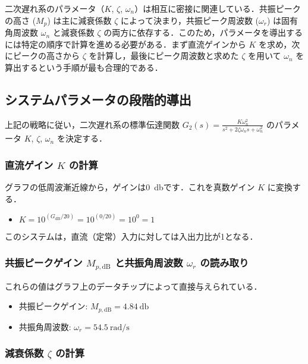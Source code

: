 \documentclass[11pt,a4paper]{ltjsarticle}
\newcommand{\supcite}[1]{\textsuperscript{\cite{#1}}}
\begin{document}
二次遅れ系のパラメータ（$K$, $\zeta$, $\omega_n$）は相互に密接に関連している．共振ピークの高さ ($M_p$) は主に減衰係数 $\zeta$ によって決まり，共振ピーク周波数 ($\omega_r$) は固有角周波数 $\omega_n$ と減衰係数 $\zeta$ の両方に依存する．このため，パラメータを導出するには特定の順序で計算を進める必要がある．まず直流ゲインから $K$ を求め，次にピークの高さから $\zeta$ を計算し，最後にピーク周波数と求めた $\zeta$ を用いて $\omega_n$ を算出するという手順が最も合理的である．

\subsection{システムパラメータの段階的導出}

上記の戦略に従い，二次遅れ系の標準伝達関数 $G_2(s) = \frac{K\omega_n^2}{s^2 + 2\zeta\omega_n s + \omega_n^2}$ のパラメータ $K$, $\zeta$, $\omega_n$ を決定する\supcite{ref8}．

\subsubsection{直流ゲイン $K$ の計算}

グラフの低周波漸近線から，ゲインは\SI{0}{\decibel}です\supcite{ref1}．これを真数ゲイン $K$ に変換する．
\begin{itemize}
    \item $K = 10^{(G_{\text{dB}}/20)} = 10^{(0/20)} = 10^0 = 1$
\end{itemize}
このシステムは，直流（定常）入力に対しては入出力比が1となる．

\subsubsection{共振ピークゲイン \texorpdfstring{$M_{p,\text{dB}}$}{Mp,dB} と共振角周波数 \texorpdfstring{$\omega_r$}{ωr} の読み取り}

これらの値はグラフ上のデータチップによって直接与えられている\supcite{ref1}．
\begin{itemize}
    \item 共振ピークゲイン: $M_{p,\text{dB}} = \SI{4.84}{\decibel}$
    \item 共振角周波数: $\omega_r = \SI{54.5}{\radian\per\second}$
\end{itemize}

\subsubsection{減衰係数 \texorpdfstring{$\zeta$}{ζ} の計算}
\end{document}
